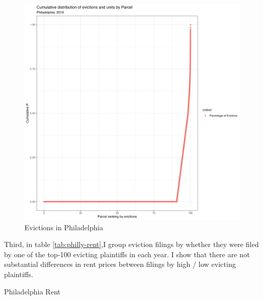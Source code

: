 \documentclass{article}
\begin{document}
\begin{figure}[htbp]
    \centering
    \includegraphics[width=1\linewidth]{figs/cumulative_evict_dist_parcels.png}
    \caption{Evictions in Philadelphia}
    \label{fig:philly-evict-parcel}
\end{figure}

Third, in table \ref{tab:philly-rent},I group eviction filings by whether they were filed by one of the top-100 evicting plaintiffs in each year. I show that there are not substantial differences in rent prices between filings by high / low evicting plaintiffs.\\

\begin{table}[htbp]
    
    \caption{Philadelphia Rent}
    \label{tab:philly-rent}
\end{table}



\end{document}
